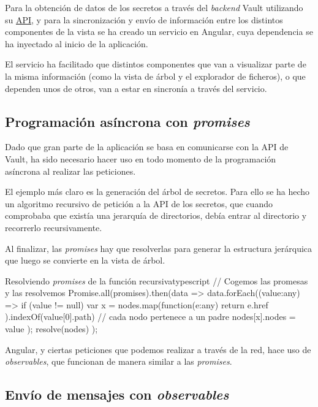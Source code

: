 \documentclass{\ClassPath/viu-tfm-template}
\begin{document}
Para la obtención de datos de los secretos a través del \textit{backend} Vault utilizando su \href{https://developer.hashicorp.com/vault/api-docs}{API}, y para la sincronización y envío de información entre los distintos componentes de la vista se ha creado un servicio en Angular, cuya dependencia se ha inyectado al inicio de la aplicación.

El servicio ha facilitado que distintos componentes que van a visualizar parte de la misma información (como la vista de árbol y el explorador de ficheros), o que dependen unos de otros, van a estar en sincronía a través del servicio.


\subsection{Programación asíncrona con \textit{promises}}

Dado que gran parte de la aplicación se basa en comunicarse con la API de Vault, ha sido necesario hacer uso en todo momento de la programación asíncrona al realizar las peticiones.

El ejemplo más claro es la generación del árbol de secretos. Para ello se ha hecho un algoritmo recursivo de petición a la API de los secretos, que cuando comprobaba que existía una jerarquía de directorios, debía entrar al directorio y recorrerlo recursivamente.

Al finalizar, las \textit{promises} hay que resolverlas para generar la estructura jerárquica que luego se convierte en la vista de árbol.

\begin{mycode}{Resolviendo \textit{promises} de la función recursiva}{typescript}{}
// Cogemos las promesas y las resolvemos
Promise.all(promises).then(data => {
    data.forEach((value:any) => {
        if (value != null){
            var x = nodes.map(function(e:any){
                return e.href
            }).indexOf(value[0].path)
            // cada nodo pertenece a un padre
            nodes[x].nodes = value
        }
    });
    resolve(nodes)
});
\end{mycode}

Angular, y ciertas peticiones que podemos realizar a través de la red, hace uso de \textit{observables}, que funcionan de manera similar a las \textit{promises}.

\subsection{Envío de mensajes con \textit{observables}}
\end{document}
